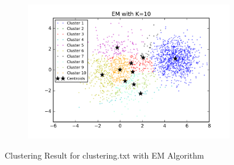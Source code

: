 \begin{description}
\begin{description}
\begin{figure}[!h]
\begin{subfigure}[b]{0.475\textwidth}
        \end{subfigure}
        \hfill
        \begin{subfigure}[b]{0.475\textwidth}   
            \centering 
            \includegraphics[width=\textwidth]{./figures/clustering_EM_10.png}
        \end{subfigure}
        
        \caption{Clustering Result for clustering.txt with EM Algorithm}
        \label{fig:EM_clustering}
\end{figure}


\end{description}
\end{description}
